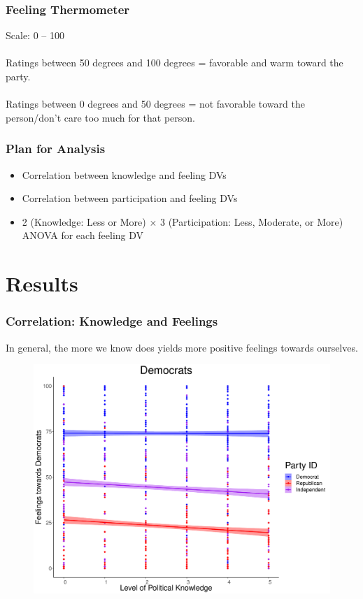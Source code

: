 \documentclass[14pt]{beamer}
\begin{document}
\begin{frame}
\frametitle{Feeling Thermometer}
\begin{center}
	Scale: 0 -- 100 
	~~\\
	~~\\
	Ratings between 50 degrees and 100 degrees  =  favorable and warm toward the party. 
	~~\\
	~~\\
	Ratings between 0 degrees and 50 degrees  = not favorable toward the person/don't care too much for that person.
\end{center}
\end{frame}

\begin{frame}
\frametitle{Plan for Analysis}
\begin{itemize}
	\item Correlation between knowledge and feeling DVs
	\item Correlation between participation and feeling DVs
	\item 2 (Knowledge: Less or More) $\times$ 3 (Participation: Less, Moderate, or More) ANOVA for each feeling DV
\end{itemize}
\end{frame}

\section{Results}

\begin{frame}
\frametitle{Correlation: Knowledge and Feelings}
\begin{center}
In general, the more we know does yields more positive feelings towards ourselves.
\end{center}
\end{frame}

\begin{frame}
\begin{center}
	\begin{figure}[ht!]  
		{	 \includegraphics[width=.9\textwidth]{KFDem}}
	\end{figure}
\end{center}
\end{frame}
\end{document}
